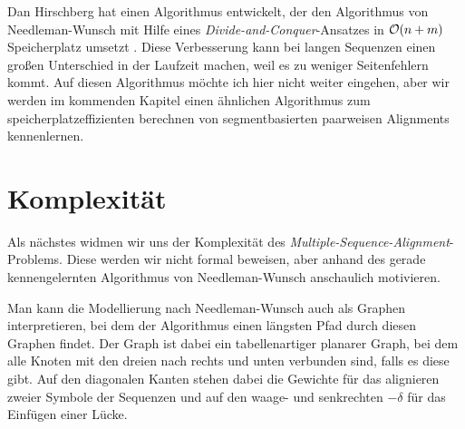 Dan Hirschberg hat einen Algorithmus entwickelt, der den Algorithmus von Needleman-Wunsch mit Hilfe eines \emph{Divide-and-Conquer}-Ansatzes in $\mathcal{O}(n+m)$ Speicherplatz umsetzt \cite{h75}. Diese Verbesserung kann bei langen Sequenzen einen großen Unterschied in der Laufzeit machen, weil es zu weniger Seitenfehlern kommt. Auf diesen Algorithmus möchte ich hier nicht weiter eingehen, aber wir werden im kommenden Kapitel einen ähnlichen Algorithmus zum speicherplatzeffizienten berechnen von segmentbasierten paarweisen Alignments kennenlernen.

\section{Komplexität}

Als nächstes widmen wir uns der Komplexität des \emph{Multiple-Sequence-Alignment}-Problems. Diese werden wir nicht formal beweisen, aber anhand des gerade kennengelernten Algorithmus von Needleman-Wunsch anschaulich motivieren.

Man kann die Modellierung nach Needleman-Wunsch auch als Graphen interpretieren, bei dem der Algorithmus einen längsten Pfad durch diesen Graphen findet. Der Graph ist dabei ein tabellenartiger planarer Graph, bei dem alle Knoten mit den dreien nach rechts und unten verbunden sind, falls es diese gibt. Auf den diagonalen Kanten stehen dabei die Gewichte für das alignieren zweier Symbole der Sequenzen und auf den waage- und senkrechten $-\delta$ für das Einfügen einer Lücke.

\footnotesize
\begin{center}
\end{center}
\normalsize

